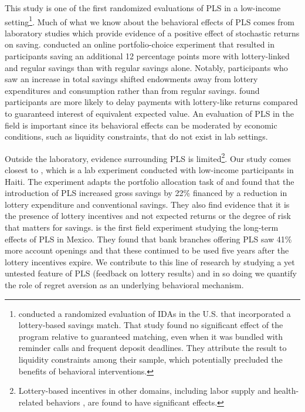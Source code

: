 \documentclass[12pt]{article}
\begin{document}
	This study is one of the first randomized evaluations of PLS in a low-income setting\footnote{\textcite{loibl_testing_2016} conducted a randomized evaluation of IDAs in the U.S. that incorporated a lottery-based savings match. That study found no significant effect of the program relative to guaranteed matching, even when it was bundled with reminder calls and frequent deposit deadlines. They attribute the result to liquidity constraints among their sample, which potentially precluded the benefits of behavioral interventions.}. Much of what we know about the behavioral effects of PLS comes from laboratory studies which provide evidence of a positive effect of stochastic returns on saving. \textcite{atalay_savings_2014} conducted an online portfolio-choice experiment that resulted in participants saving an additional 12 percentage points more with lottery-linked and regular savings than with regular savings alone. Notably, participants who saw an increase in total savings shifted endowments away from lottery expenditures and consumption rather than from regular savings. \textcite{filiz-ozbay_lottery_2015} found participants are more likely to delay payments with lottery-like returns compared to guaranteed interest of equivalent expected value. An evaluation of PLS in the field is important since its behavioral effects can be moderated by economic conditions, such as liquidity constraints, that do not exist in lab settings.

	Outside the laboratory, evidence surrounding PLS is limited\footnote{Lottery-based incentives in other domains, including labor supply \parencite{brune_effect_2015} and health-related behaviors \parencite{kimmel_randomized_2012,bjorkman_nyqvist_using_2015}, are found to have significant effects.}. Our study comes closest to \textcite{dizon_leveraging_2016}, which is a lab experiment conducted with low-income participants in Haiti. The experiment adapts the portfolio allocation task of \textcite{atalay_savings_2014} and found that the introduction of PLS increased gross savings by 22\% financed by a reduction in lottery expenditure and conventional savings. They also find evidence that it is the presence of lottery incentives and not expected returns or the degree of risk that matters for savings. \textcite{gertler_long-term_2017} is the first field experiment studying the long-term effects of PLS in Mexico. They found that bank branches offering PLS saw 41\% more account openings and that these continued to be used five years after the lottery incentives expire. We contribute to this line of research by studying a yet untested feature of PLS (feedback on lottery results) and in so doing we quantify the role of regret aversion as an underlying behavioral mechanism.
\end{document}
